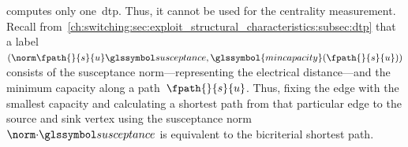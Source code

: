 computes only one~\gls{dtp}. Thus, it cannot be used for the centrality
measurement. Recall
from~\cref{ch:switching:sec:exploit_structural_characteristics:subsec:dtp} that
a label~$(\bnorm{\fpath{}{\source}{\vertexa}},
\glssymbol{mincapacity}(\fpath{}{\source}{\vertexa}))$ consists of the
susceptance norm---representing the electrical distance---and the minimum
capacity along a path~$\fpath{}{\source}{\vertexa}$. Thus, fixing the edge with
the smallest capacity and calculating a shortest path from that particular edge
to the source and sink vertex using the susceptance norm~$\bnorm{\cdot}$ is
equivalent to the bicriterial shortest path.
% 
